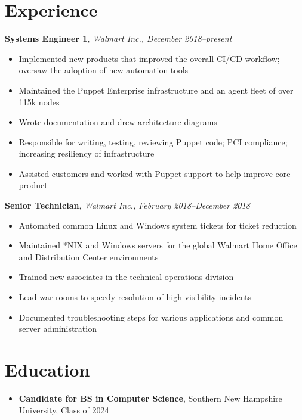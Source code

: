 \documentclass[10pt]{article}
\begin{document}
\section*{Experience}
\noindent\textbf{Systems Engineer 1}, \textit{Walmart Inc., December 2018\thinspace--\thinspace present}
\begin{itemize}
    \item Implemented new products that improved the overall CI/CD workflow; oversaw the adoption of new automation tools
    \item Maintained the Puppet Enterprise infrastructure and an agent fleet of over 115k nodes
    \item Wrote documentation and drew architecture diagrams
    \item Responsible for writing, testing, reviewing Puppet code; PCI compliance; increasing resiliency of infrastructure
    \item Assisted customers and worked with Puppet support to help improve core product
\end{itemize}
\noindent\textbf{Senior Technician}, \textit{Walmart Inc., February 2018\thinspace--\thinspace December 2018}
\begin{itemize}
    \item Automated common Linux and Windows system tickets for ticket reduction
    \item Maintained *NIX and Windows servers for the global Walmart Home Office and Distribution Center environments
    \item Trained new associates in the technical operations division
    \item Lead war rooms to speedy resolution of high visibility incidents
    \item Documented troubleshooting steps for various applications and common server administration
\end{itemize}

\section*{Education}
\begin{itemize}
    \item \textbf{Candidate for BS in Computer Science}, Southern New Hampshire University, Class of 2024
\end{itemize}
\end{document}

